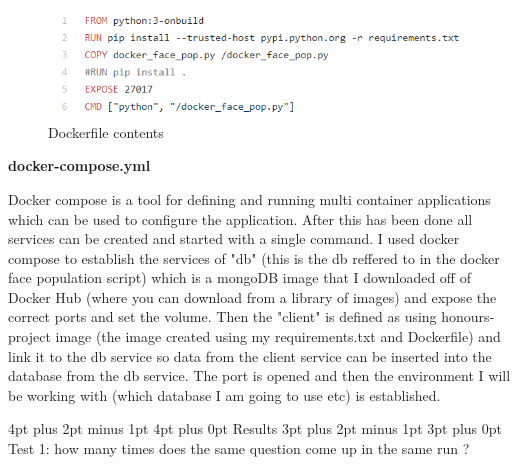 \documentclass[12pt,a4paper]{article}
\makeatletter
\renewcommand\subsection{\@startsection {subsection}{1}{2mm} %
                               {3pt plus 2pt minus 1pt} %
                               {3pt plus 0pt} %
                               {\normalfont\bfseries}}
\renewcommand\section{\@startsection {section}{1}{0mm} %
                               {4pt plus 2pt minus 1pt} %
                               {4pt plus 0pt} %
                               {\bfseries}}
\makeatother
\begin{document}
\begin{figure}[h]
    \centering
    \includegraphics[width=1.0\textwidth]{Figs/Dockerfile.PNG} 
    \caption{Dockerfile contents} 
    \label{Dockerfile}
\end{figure}  

\textbf{docker-compose.yml} 

Docker compose is a tool for defining and running multi container applications which can be used to configure the application. After this has been done all services can be created and started with a single command. I used docker compose to establish the services of "db" (this is the db reffered to in the docker face population script) which is a mongoDB image that I downloaded off of Docker Hub (where you can download from a library of images) and expose the correct ports and set the volume. Then the "client" is defined as using honours-project image (the image created using my requirements.txt and Dockerfile) and link it to the db service so data from the client service can be inserted into the database from the db service. The port is opened and then the environment I will be working with (which database I am going to use etc) is established.


\section{Results} 
\subsection{Test 1: how many times does the same question come up in the same run ?}  
\end{document}
